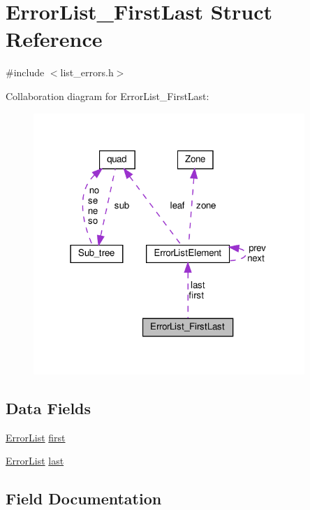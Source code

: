 \hypertarget{structErrorList__FirstLast}{}\section{Error\+List\+\_\+\+First\+Last Struct Reference}
\label{structErrorList__FirstLast}


{\ttfamily \#include $<$list\+\_\+errors.\+h$>$}



Collaboration diagram for Error\+List\+\_\+\+First\+Last\+:\nopagebreak
\begin{figure}[H]
\begin{center}
\leavevmode
\includegraphics[width=291pt]{structErrorList__FirstLast__coll__graph}
\end{center}
\end{figure}
\subsection*{Data Fields}
\begin{DoxyCompactItemize}
\item 
\hyperlink{list__errors_8h_a90522ae3e839b4beec367e58bc649808}{Error\+List} \hyperlink{structErrorList__FirstLast_a9953e66189d7a875e3c0ce919ae0e243}{first}
\item 
\hyperlink{list__errors_8h_a90522ae3e839b4beec367e58bc649808}{Error\+List} \hyperlink{structErrorList__FirstLast_ab1810567d2d39e9b6784a3b04cde8492}{last}
\end{DoxyCompactItemize}


\subsection{Field Documentation}
\mbox{\label{structErrorList__FirstLast_a9953e66189d7a875e3c0ce919ae0e243}} 
